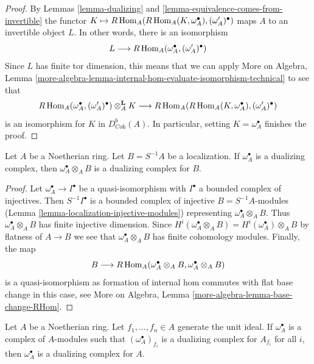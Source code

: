 \begin{proof}
By Lemmas \ref{lemma-dualizing} and
\ref{lemma-equivalence-comes-from-invertible} the functor
$K \mapsto R\mathop{\mathrm{Hom}}\nolimits_A(R\mathop{\mathrm{Hom}}\nolimits_A(K, \omega_A^\bullet), (\omega_A')^\bullet)$
maps $A$ to an invertible object $L$. In other words, there is
an isomorphism
$$
L \longrightarrow R\mathop{\mathrm{Hom}}\nolimits_A(\omega_A^\bullet, (\omega_A')^\bullet)
$$
Since $L$ has finite tor dimension, this means that we can apply
More on Algebra, Lemma
\ref{more-algebra-lemma-internal-hom-evaluate-isomorphism-technical}
to see that
$$
R\mathop{\mathrm{Hom}}\nolimits_A(\omega_A^\bullet, (\omega'_A)^\bullet) \otimes_A^\mathbf{L} K
\longrightarrow
R\mathop{\mathrm{Hom}}\nolimits_A(R\mathop{\mathrm{Hom}}\nolimits_A(K, \omega_A^\bullet), (\omega_A')^\bullet)
$$
is an isomorphism for $K$ in $D^b_{\textit{Coh}}(A)$.
In particular, setting $K = \omega_A^\bullet$ finishes the proof.
\end{proof}

\begin{lemma}
\label{lemma-dualizing-localize}
Let $A$ be a Noetherian ring. Let $B = S^{-1}A$ be a localization.
If $\omega_A^\bullet$ is a dualizing
complex, then $\omega_A^\bullet \otimes_A B$ is a dualizing
complex for $B$.
\end{lemma}

\begin{proof}
Let $\omega_A^\bullet \to I^\bullet$ be a quasi-isomorphism
with $I^\bullet$ a bounded complex of injectives.
Then $S^{-1}I^\bullet$ is a bounded complex of injective
$B = S^{-1}A$-modules (Lemma \ref{lemma-localization-injective-modules})
representing $\omega_A^\bullet \otimes_A B$.
Thus $\omega_A^\bullet \otimes_A B$ has finite injective dimension.
Since $H^i(\omega_A^\bullet \otimes_A B) = H^i(\omega_A^\bullet) \otimes_A B$
by flatness of $A \to B$ we see that $\omega_A^\bullet \otimes_A B$
has finite cohomology modules. Finally, the map
$$
B \longrightarrow
R\mathop{\mathrm{Hom}}\nolimits_A(\omega_A^\bullet \otimes_A B, \omega_A^\bullet \otimes_A B)
$$
is a quasi-isomorphism as formation of internal hom commutes with
flat base change in this case, see
More on Algebra, Lemma \ref{more-algebra-lemma-base-change-RHom}.
\end{proof}

\begin{lemma}
\label{lemma-dualizing-glue}
Let $A$ be a Noetherian ring. Let $f_1, \ldots, f_n \in A$
generate the unit ideal. If $\omega_A^\bullet$ is a complex
of $A$-modules such that $(\omega_A^\bullet)_{f_i}$ is a dualizing
complex for $A_{f_i}$ for all $i$, then $\omega_A^\bullet$ is a dualizing
complex for $A$.
\end{lemma}

